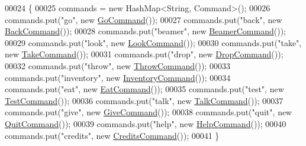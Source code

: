 \begin{DoxyCode}
00024                           \{
00025         commands = \textcolor{keyword}{new} HashMap<String, Command>();
00026         commands.put(\textcolor{stringliteral}{"go"}, \textcolor{keyword}{new} \hyperlink{classpkg__commands_1_1GoCommand}{GoCommand}());
00027         commands.put(\textcolor{stringliteral}{"back"}, \textcolor{keyword}{new} \hyperlink{classpkg__commands_1_1BackCommand}{BackCommand}());
00028         commands.put(\textcolor{stringliteral}{"beamer"}, \textcolor{keyword}{new} \hyperlink{classpkg__commands_1_1BeamerCommand}{BeamerCommand}());
00029         commands.put(\textcolor{stringliteral}{"look"}, \textcolor{keyword}{new} \hyperlink{classpkg__commands_1_1LookCommand}{LookCommand}());
00030         commands.put(\textcolor{stringliteral}{"take"}, \textcolor{keyword}{new} \hyperlink{classpkg__commands_1_1TakeCommand}{TakeCommand}());
00031         commands.put(\textcolor{stringliteral}{"drop"}, \textcolor{keyword}{new} \hyperlink{classpkg__commands_1_1DropCommand}{DropCommand}());
00032         commands.put(\textcolor{stringliteral}{"throw"}, \textcolor{keyword}{new} \hyperlink{classpkg__commands_1_1ThrowCommand}{ThrowCommand}());
00033         commands.put(\textcolor{stringliteral}{"inventory"}, \textcolor{keyword}{new} \hyperlink{classpkg__commands_1_1InventoryCommand}{InventoryCommand}());
00034         commands.put(\textcolor{stringliteral}{"eat"}, \textcolor{keyword}{new} \hyperlink{classpkg__commands_1_1EatCommand}{EatCommand}());
00035         commands.put(\textcolor{stringliteral}{"test"}, \textcolor{keyword}{new} \hyperlink{classpkg__commands_1_1TestCommand}{TestCommand}());
00036         commands.put(\textcolor{stringliteral}{"talk"}, \textcolor{keyword}{new} \hyperlink{classpkg__commands_1_1TalkCommand}{TalkCommand}());
00037         commands.put(\textcolor{stringliteral}{"give"}, \textcolor{keyword}{new} \hyperlink{classpkg__commands_1_1GiveCommand}{GiveCommand}());
00038         commands.put(\textcolor{stringliteral}{"quit"}, \textcolor{keyword}{new} \hyperlink{classpkg__commands_1_1QuitCommand}{QuitCommand}());
00039         commands.put(\textcolor{stringliteral}{"help"}, \textcolor{keyword}{new} \hyperlink{classpkg__commands_1_1HelpCommand}{HelpCommand}());
00040         commands.put(\textcolor{stringliteral}{"credits"}, \textcolor{keyword}{new} \hyperlink{classpkg__commands_1_1CreditsCommand}{CreditsCommand}());
00041     \}
\end{DoxyCode}



